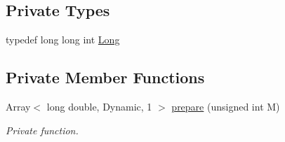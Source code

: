 \subsection*{Private Types}
\begin{DoxyCompactItemize}
\item 
typedef long long int \hyperlink{class_c_dynamic_system_r_n_g_ab5df6da5f9eaeb3d9cddc97405a09995}{Long}
\end{DoxyCompactItemize}
\subsection*{Private Member Functions}
\begin{DoxyCompactItemize}
\item 
Array$<$ long double, Dynamic, 1 $>$ \hyperlink{class_c_dynamic_system_r_n_g_abeca12f69df980c9bf34786d3acc850c}{prepare} (unsigned int M)
\begin{DoxyCompactList}\small\item\em Private function. \end{DoxyCompactList}\end{DoxyCompactItemize}
